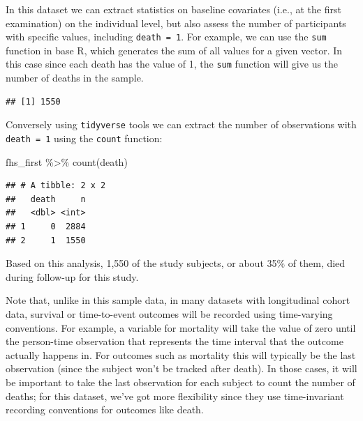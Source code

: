 \documentclass[
]{book}
\newenvironment{Shaded}{\begin{snugshade}}{\end{snugshade}}
\newcommand{\FunctionTok}[1]{\textcolor[rgb]{0.00,0.00,0.00}{#1}}
\newcommand{\NormalTok}[1]{#1}
\newcommand{\SpecialCharTok}[1]{\textcolor[rgb]{0.00,0.00,0.00}{#1}}
\begin{document}
In this dataset we can extract statistics on baseline covariates (i.e., at the first examination) on the individual level, but also assess the number of participants with specific values, including \texttt{death\ =\ 1}. For example, we can use the \texttt{sum} function in base R, which generates the sum of all values for a given vector. In this case since each death has the value of 1, the \texttt{sum} function will give us the number of deaths in the sample.

\begin{Shaded}
\end{Shaded}

\begin{verbatim}
## [1] 1550
\end{verbatim}

Conversely using \texttt{tidyverse} tools we can extract the number of observations with \texttt{death\ =\ 1} using the \texttt{count} function:

\begin{Shaded}
\begin{Highlighting}[]
\NormalTok{fhs\_first }\SpecialCharTok{\%\textgreater{}\%} 
  \FunctionTok{count}\NormalTok{(death) }
\end{Highlighting}
\end{Shaded}

\begin{verbatim}
## # A tibble: 2 x 2
##   death     n
##   <dbl> <int>
## 1     0  2884
## 2     1  1550
\end{verbatim}

Based on this analysis, 1,550 of the study subjects, or about 35\% of them, died during follow-up for this study.

Note that, unlike in this sample data, in many datasets with longitudinal cohort data, survival or time-to-event outcomes will be recorded using time-varying conventions. For example, a variable for mortality will take the value of zero until the person-time observation that represents the time interval that the outcome actually happens in. For outcomes such as mortality this will typically be the last observation (since the subject won't be tracked after death). In those cases, it will be important to take the last observation for each subject to count the number of deaths; for this dataset, we've got more flexibility since they use time-invariant recording conventions for outcomes like death.
\end{document}
